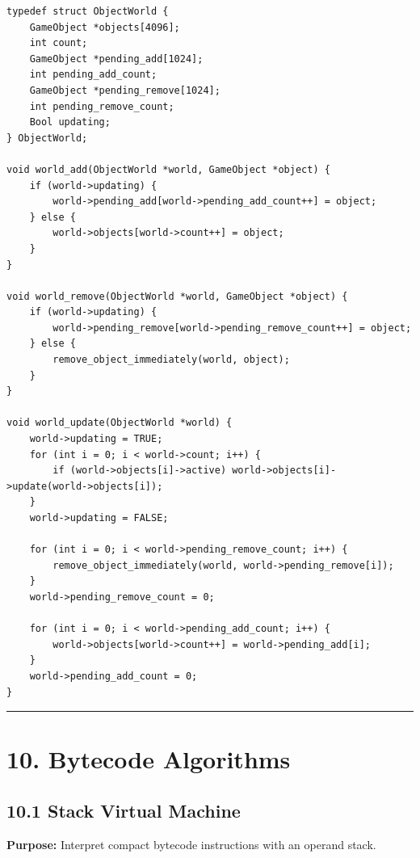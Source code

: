 \documentclass[10pt,letterpaper]{article}
\begin{document}
\begin{verbatim}
typedef struct ObjectWorld {
    GameObject *objects[4096];
    int count;
    GameObject *pending_add[1024];
    int pending_add_count;
    GameObject *pending_remove[1024];
    int pending_remove_count;
    Bool updating;
} ObjectWorld;

void world_add(ObjectWorld *world, GameObject *object) {
    if (world->updating) {
        world->pending_add[world->pending_add_count++] = object;
    } else {
        world->objects[world->count++] = object;
    }
}

void world_remove(ObjectWorld *world, GameObject *object) {
    if (world->updating) {
        world->pending_remove[world->pending_remove_count++] = object;
    } else {
        remove_object_immediately(world, object);
    }
}

void world_update(ObjectWorld *world) {
    world->updating = TRUE;
    for (int i = 0; i < world->count; i++) {
        if (world->objects[i]->active) world->objects[i]->update(world->objects[i]);
    }
    world->updating = FALSE;

    for (int i = 0; i < world->pending_remove_count; i++) {
        remove_object_immediately(world, world->pending_remove[i]);
    }
    world->pending_remove_count = 0;

    for (int i = 0; i < world->pending_add_count; i++) {
        world->objects[world->count++] = world->pending_add[i];
    }
    world->pending_add_count = 0;
}
\end{verbatim}

\medskip\hrule\medskip

\clearpage
\section{10. Bytecode Algorithms}

\subsection{10.1 Stack Virtual Machine}

\textbf{Purpose:} Interpret compact bytecode instructions with an operand stack.
\end{document}

